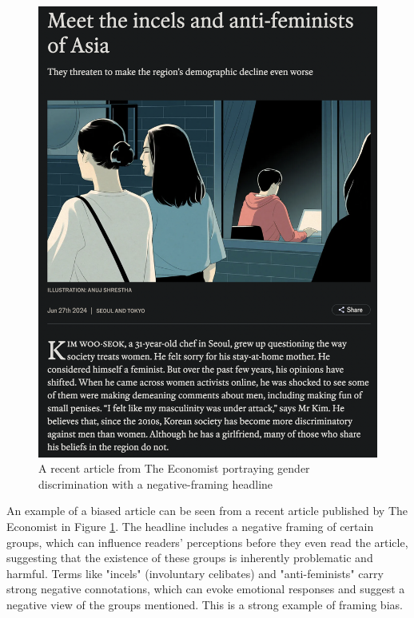 \begin{figure}[htbp]
    \centering
    \includegraphics[width=0.9\linewidth]{images/the-economist-biased-article.png}
    \caption{A recent article from The Economist \cite{economist-2024-incels} portraying gender discrimination with a negative-framing headline}
    \label{fig:the-economist-biased-article}
\end{figure}

An example of a biased article can be seen from a recent article published by The Economist \cite{economist-2024-incels} in Figure \ref{fig:the-economist-biased-article}. The headline includes a negative framing of certain groups, which can influence readers' perceptions before they even read the article, suggesting that the existence of these groups is inherently problematic and harmful. Terms like "incels" (involuntary celibates) and "anti-feminists" carry strong negative connotations, which can evoke emotional responses and suggest a negative view of the groups mentioned. This is a strong example of framing bias.

